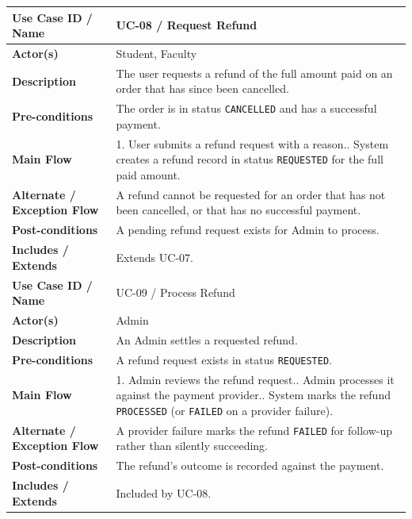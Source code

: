 \documentclass[12pt,a4paper]{report}
\begin{document}
\begin{center}
\begin{longtable}{|p{3.3cm}|p{10.7cm}|}
\textbf{Use Case ID / Name} & UC-08 / Request Refund \\ \hline
\textbf{Actor(s)} & Student, Faculty \\ \hline
\textbf{Description} & The user requests a refund of the full amount paid on an order that has since been cancelled. \\ \hline
\textbf{Pre-conditions} & The order is in status \texttt{CANCELLED} and has a successful payment. \\ \hline
\textbf{Main Flow} & 1. User submits a refund request with a reason.\newline 2. System creates a refund record in status \texttt{REQUESTED} for the full paid amount. \\ \hline
\textbf{Alternate / Exception Flow} & A refund cannot be requested for an order that has not been cancelled, or that has no successful payment. \\ \hline
\textbf{Post-conditions} & A pending refund request exists for Admin to process. \\ \hline
\textbf{Includes / Extends} & Extends UC-07. \\ \hline

\textbf{Use Case ID / Name} & UC-09 / Process Refund \\ \hline
\textbf{Actor(s)} & Admin \\ \hline
\textbf{Description} & An Admin settles a requested refund. \\ \hline
\textbf{Pre-conditions} & A refund request exists in status \texttt{REQUESTED}. \\ \hline
\textbf{Main Flow} & 1. Admin reviews the refund request.\newline 2. Admin processes it against the payment provider.\newline 3. System marks the refund \texttt{PROCESSED} (or \texttt{FAILED} on a provider failure). \\ \hline
\textbf{Alternate / Exception Flow} & A provider failure marks the refund \texttt{FAILED} for follow-up rather than silently succeeding. \\ \hline
\textbf{Post-conditions} & The refund's outcome is recorded against the payment. \\ \hline
\textbf{Includes / Extends} & Included by UC-08. \\ \hline


\end{longtable}
\end{center}
\end{document}
